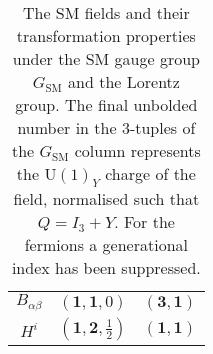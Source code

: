 \begin{table}[t]
\begin{tabular}{ccc}
    $B_{\alpha \beta}$           & $(\mathbf{1}, \mathbf{1}, 0)$                                             & $(\mathbf{3}, \mathbf{1})$                      \\
    $H^{i}$                      & $(\mathbf{1}, \mathbf{2}, \tfrac{1}{2})$                                  & $(\mathbf{1}, \mathbf{1})$                      \\
    \bottomrule
  \end{tabular}
  \egroup
  \caption{The SM fields and their transformation properties under the SM gauge
    group $G_{\text{SM}}$ and the Lorentz group. The final unbolded number in
    the 3-tuples of the $G_{\text{SM}}$ column represents the $\mathrm{U}(1)_Y$
    charge of the field, normalised such that $Q = I_{3} + Y$. For the fermions
    a generational index has been suppressed.}
  \label{tbl:sm}
\end{table}

